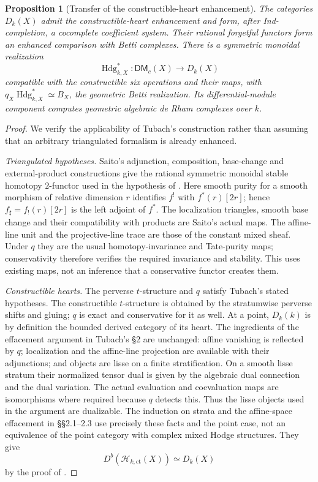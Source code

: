 \documentclass[11pt]{article}
\numberwithin{equation}{section}
\newtheorem{proposition}[proposition]{Proposition}
\theoremstyle{definition}
\theoremstyle{remark}
\begin{document}
\begin{proposition}[Transfer of the constructible-heart enhancement]
\label{prop:arithmetic-enhancement}
The categories $D_k(X)$ admit the constructible-heart enhancement and
form, after Ind-completion, a cocomplete coefficient system. Their
rational forgetful functors form an enhanced comparison with Betti
complexes. There is a symmetric monoidal realization
\[
 \operatorname{Hdg}_{k,X}^*:\mathsf{DM}_c(X)\longrightarrow D_k(X)
\]
compatible with the constructible six operations and their maps, with
$q_X\operatorname{Hdg}_{k,X}^*\simeq B_X$, the geometric Betti
realization. Its differential-module component computes geometric
algebraic de Rham complexes over $k$.
\end{proposition}
\begin{proof}
We verify the applicability of Tubach's construction rather than assuming
that an arbitrary triangulated formalism is already enhanced.

\emph{Triangulated hypotheses.}
Saito's adjunction, composition, base-change and external-product
constructions give the rational symmetric monoidal stable homotopy
$2$-functor used in the hypothesis of \cite[\S2]{Tubach}.
Here smooth purity for a smooth morphism of relative dimension $r$
identifies $f^!$ with $f^*(r)[2r]$; hence
$f_\sharp=f_!(r)[2r]$ is the left adjoint of $f^*$.
The localization triangles, smooth base change and their compatibility
with products are Saito's actual maps. The affine-line unit and the
projective-line trace are those of the constant mixed sheaf. Under $q$
they are the usual homotopy-invariance and Tate-purity maps; conservativity
therefore verifies the required invariance and stability. This uses
existing maps, not an inference that a conservative functor creates them.

\emph{Constructible hearts.}
The perverse $t$-structure and $q$ satisfy Tubach's stated hypotheses.
The constructible $t$-structure is obtained by the stratumwise perverse
shifts and gluing; $q$ is exact and conservative for it as well.
At a point, $D_k(k)$ is by definition the bounded derived category of
its heart. The ingredients of the effacement argument in Tubach's
\S2 are unchanged: affine vanishing is reflected by $q$; localization
and the affine-line projection are available with their adjunctions;
and objects are lisse on a finite stratification. On a smooth lisse
stratum their normalized tensor dual is given by the algebraic dual
connection and the dual variation. The actual evaluation and
coevaluation maps are isomorphisms where required because $q$ detects
this. Thus the lisse objects used in the argument are dualizable.
The induction on strata and the affine-space effacement in \S\S2.1--2.3
use precisely these facts and the point case, not an equivalence of the
point category with complex mixed Hodge structures. They give
\begin{equation}\label{eq:arithmetic-constructible-heart}
 D^b(\mathcal H_{k,\mathrm{ct}}(X))\simeq D_k(X)
\end{equation}
by the proof of \cite[Corollary~2.19]{Tubach}.


\end{proof}
\end{document}
